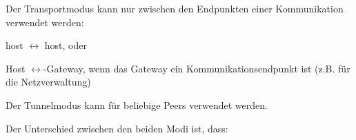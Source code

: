 \documentclass[a4paper]{article}
\begin{document}
\begin{multicols}{3}
\begin{itemize*}
            \begin{itemize*}
                  \item Der Transportmodus kann nur zwischen den Endpunkten einer Kommunikation verwendet werden:
                  \begin{itemize*}
                        \item host $\leftrightarrow$ host, oder
                        \item Host $\leftrightarrow$-Gateway, wenn das Gateway ein Kommunikationsendpunkt ist (z.B. für die Netzverwaltung)
                  \end{itemize*}
                  \item Der Tunnelmodus kann für beliebige Peers verwendet werden.
            \end{itemize*}
      \end{itemize*}

      Der Unterschied zwischen den beiden Modi ist, dass:


\end{multicols}
\end{document}
